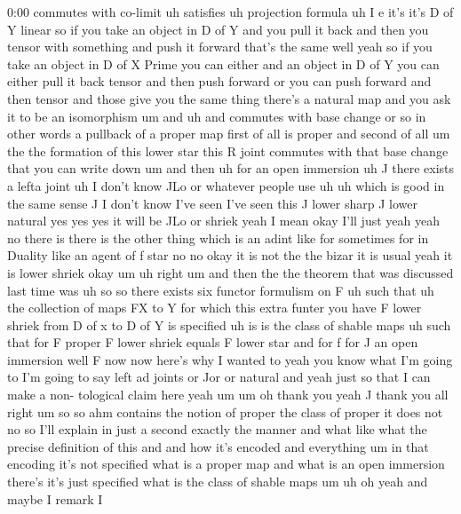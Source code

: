 \begin{unfinished}{0:00}
commutes  with
co-limit  uh
satisfies  uh  projection
formula  uh  I  e  it's  it's  D  of  Y
linear  so  if  you  take  an  object  in  D  of
Y  and  you  pull  it  back  and  then  you
tensor  with  something  and  push  it
forward  that's  the  same  well  yeah  so  if
you  take  an  object  in  D  of  X  Prime  you
can  either  and  an  object  in  D  of  Y  you
can  either  pull  it  back  tensor  and  then
push  forward  or  you  can  push  forward  and
then  tensor  and  those  give  you  the  same
thing  there's  a  natural  map  and  you  ask
it  to  be  an
isomorphism  um  and  uh  and  commutes  with
base  change
or  so  in  other  words  a  pullback  of  a
proper  map  first  of  all  is  proper  and
second  of  all  um  the  the  formation  of
this  lower  star  this  R  joint  commutes
with  that  base  change  that  you  can  write
down  um  and  then  uh  for  an  open
immersion  uh  J  there  exists  a  lefta
joint
uh  I  don't  know  JLo  or  whatever  people
use  uh  uh  which  is
good  in  the  same
sense  J  I  don't  know  I've  seen  I've  seen
this  J  lower  sharp  J  lower  natural  yes
yes  yes  it  will  be  JLo  or  shriek  yeah  I
mean  okay  I'll  just
yeah  yeah  no  there  is  there  is  the  other
thing  which  is  an  adint  like  for
sometimes
for  in  Duality  like  an  agent  of  f  star
no  no  okay  it  is  not  the  the  bizar  it
is
usual  yeah  it  is  lower
shriek  okay
um
uh  right  um  and  then
the  the  theorem  that  was  discussed  last
time  was  uh
so  so  there  exists  six  functor  formulism
on
F  uh  such
that
uh  the  collection  of  maps
FX  to  Y  for
which  this  extra  funter  you  have  F  lower
shriek  from  D  of  x  to  D  of  Y  is
specified  uh  is  is  the  class  of  shable
maps  uh  such  that  for  F
proper  F  lower  shriek  equals  F  lower
star  and  for  f  for  J  an  open
immersion  well  F  now  now  here's  why  I
wanted  to  yeah  you  know  what  I'm  going
to  I'm  going  to  say  left  ad  joints  or
Jor  or  natural  and  yeah  just  so  that  I
can  make  a  non-  tological  claim  here
yeah
um
um  oh  thank  you  yeah  J  thank
you  all
right
um  so  so
ahm  contains  the  notion  of  proper  the
class  of
proper  it  does  not  no  so  I'll  explain  in
just  a  second  exactly  the  manner  and
what  like  what  the  precise  definition  of
this  and  and  how  it's  encoded  and
everything  um  in  that  encoding  it's  not
specified  what  is  a  proper  map  and  what
is  an  open  immersion  there's  it's  just
specified  what  is  the  class  of  shable
maps
um  uh  oh  yeah  and  maybe  I  remark  I

\end{unfinished}
